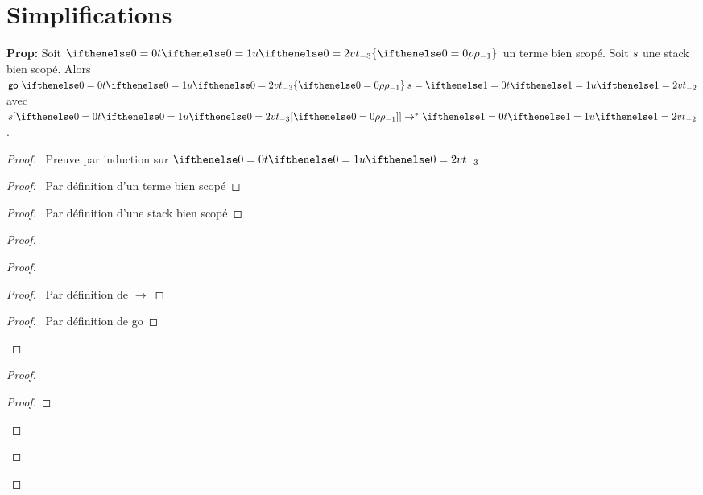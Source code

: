 \documentclass[a4paper]{article}
\begin{document}
\section{Simplifications}
\textbf{Prop:}
Soit $\scoped \aTerm \env$ un terme bien scopé. Soit $s$ une stack bien scopé.
Alors $\go {\scoped \aTerm \env} \aStack = \aTerm[1]$ avec $\stackapp \aStack {\subs \aTerm \env} \to^* \aTerm[1]$.
\begin{proof}
  \pfsketch\ Preuve par induction sur $\aTerm$
  \prove{$\stackapp \aStack {\subs \aTerm \env} \to^* \go {\scoped \aTerm \env} \aStack$ }
  \begin{proof}
    \pf\ Par définition d'un terme bien scopé
  \end{proof}
  \begin{proof}
    \pf\ Par définition d'une stack bien scopé
  \end{proof}
  \begin{proof}
    \begin{proof}
      \begin{proof}
        \pf\ Par définition de $\to$
      \end{proof}
      \begin{proof}
        \pf\ Par définition de \textsf{go}
      \end{proof}
    \end{proof}
    \begin{proof}
      \begin{proof}

\end{proof}
\end{proof}
\end{proof}
\end{proof}
\end{document}
